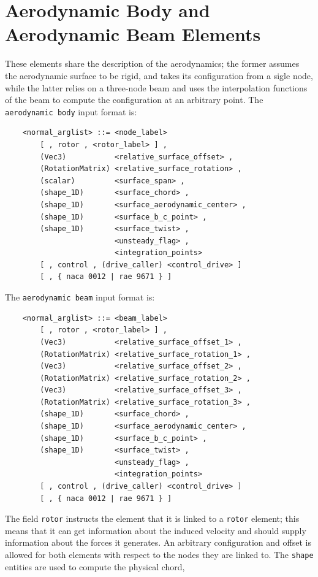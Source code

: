 \section{Aerodynamic Body and Aerodynamic Beam Elements}
These elements share the description of the aerodynamics; the former assumes
the aerodynamic surface to be rigid, and takes its configuration from a
sigle node, while the latter relies on a three-node beam and uses the
interpolation functions of the beam to compute the configuration at an 
arbitrary point.
The \texttt{aerodynamic body} input format is:
\begin{verbatim}
    <normal_arglist> ::= <node_label> 
        [ , rotor , <rotor_label> ] ,
        (Vec3)           <relative_surface_offset> , 
        (RotationMatrix) <relative_surface_rotation> ,
        (scalar)         <surface_span> ,
        (shape_1D)       <surface_chord> ,
        (shape_1D)       <surface_aerodynamic_center> ,
        (shape_1D)       <surface_b_c_point> ,
        (shape_1D)       <surface_twist> ,
                         <unsteady_flag> ,
                         <integration_points>
        [ , control , (drive_caller) <control_drive> ] 
        [ , { naca 0012 | rae 9671 } ]
\end{verbatim}
The \texttt{aerodynamic beam} input format is:
\begin{verbatim}
    <normal_arglist> ::= <beam_label> 
        [ , rotor , <rotor_label> ] ,
        (Vec3)           <relative_surface_offset_1> ,       
        (RotationMatrix) <relative_surface_rotation_1> ,
        (Vec3)           <relative_surface_offset_2> ,
        (RotationMatrix) <relative_surface_rotation_2> ,
        (Vec3)           <relative_surface_offset_3> ,       
        (RotationMatrix) <relative_surface_rotation_3> ,
        (shape_1D)       <surface_chord> ,
        (shape_1D)       <surface_aerodynamic_center> ,
        (shape_1D)       <surface_b_c_point> ,
        (shape_1D)       <surface_twist> ,
                         <unsteady_flag> ,
                         <integration_points>
        [ , control , (drive_caller) <control_drive> ] 
        [ , { naca 0012 | rae 9671 } ]
\end{verbatim}
The field \texttt{rotor} instructs the element that it is linked to a 
\texttt{rotor} element; this means that it can get information about the
induced velocity and should supply information about the forces it generates.
An arbitrary configuration and offset is allowed for both elements with
respect to the nodes they are linked to. 
The \texttt{shape} entities are used to compute the physical chord,

